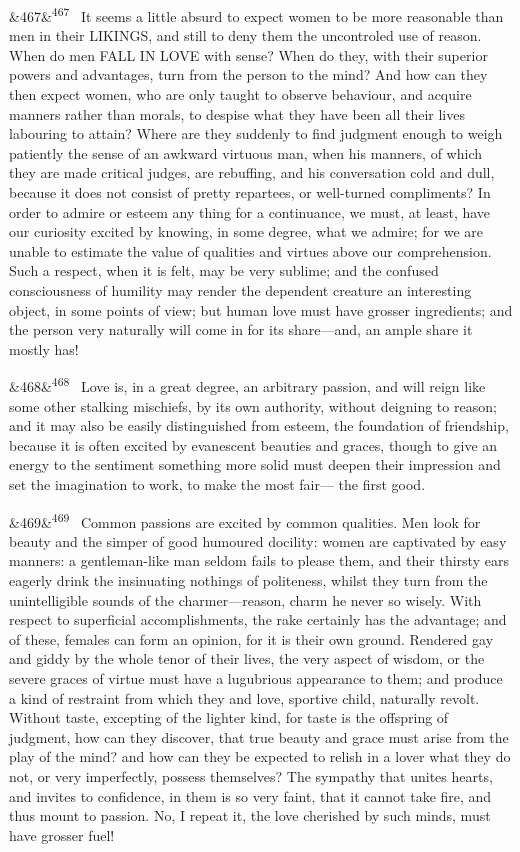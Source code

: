 \documentclass[12pt]{article}
\newcommand{\para}[1][]{\par\noindent\ifx&#1&\else\textsuperscript{\footnotesize #1}~\fi}
\begin{document}
\para[467] It seems a little absurd to expect women to be more reasonable than men in their LIKINGS, and still to deny them the uncontroled use of reason. When do men FALL IN LOVE with sense? When do they, with their superior powers and advantages, turn from the person to the mind? And how can they then expect women, who are only taught to observe behaviour, and acquire manners rather than morals, to despise what they have been all their lives labouring to attain? Where are they suddenly to find judgment enough to weigh patiently the sense of an awkward virtuous man, when his manners, of which they are made critical judges, are rebuffing, and his conversation cold and dull, because it does not consist of pretty repartees, or well-turned compliments? In order to admire or esteem any thing for a continuance, we must, at least, have our curiosity excited by knowing, in some degree, what we admire; for we are unable to estimate the value of qualities and virtues above our comprehension. Such a respect, when it is felt, may be very sublime; and the confused consciousness of humility may render the dependent creature an interesting object, in some points of view; but human love must have grosser ingredients; and the person very naturally will come in for its share---and, an ample share it mostly has!

\para[468] Love is, in a great degree, an arbitrary passion, and will reign like some other stalking mischiefs, by its own authority, without deigning to reason; and it may also be easily distinguished from esteem, the foundation of friendship, because it is often excited by evanescent beauties and graces, though to give an energy to the sentiment something more solid must deepen their impression and set the imagination to work, to make the most fair--- the first good.

\para[469] Common passions are excited by common qualities. Men look for beauty and the simper of good humoured docility: women are captivated by easy manners: a gentleman-like man seldom fails to please them, and their thirsty ears eagerly drink the insinuating nothings of politeness, whilst they turn from the unintelligible sounds of the charmer---reason, charm he never so wisely. With respect to superficial accomplishments, the rake certainly has the advantage; and of these, females can form an opinion, for it is their own ground. Rendered gay and giddy by the whole tenor of their lives, the very aspect of wisdom, or the severe graces of virtue must have a lugubrious appearance to them; and produce a kind of restraint from which they and love, sportive child, naturally revolt. Without taste, excepting of the lighter kind, for taste is the offspring of judgment, how can they discover, that true beauty and grace must arise from the play of the mind? and how can they be expected to relish in a lover what they do not, or very imperfectly, possess themselves? The sympathy that unites hearts, and invites to confidence, in them is so very faint, that it cannot take fire, and thus mount to passion. No, I repeat it, the love cherished by such minds, must have grosser fuel!
\end{document}
